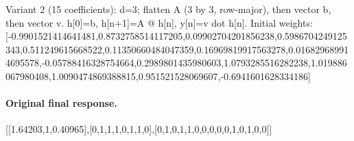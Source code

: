 Variant 2 (15 coefficients): d=3;\allowbreak{} flatten A (3 by 3,\allowbreak{} row-major),\allowbreak{} then vector b,\allowbreak{} then vector v. h[\allowbreak{}0]\allowbreak{}=b,\allowbreak{} h[\allowbreak{}n+1]\allowbreak{}=A @ h[\allowbreak{}n]\allowbreak{},\allowbreak{} y[\allowbreak{}n]\allowbreak{}=v dot h[\allowbreak{}n]\allowbreak{}. Initial weights: [\allowbreak{}-0.9901521414641481,\allowbreak{}0.8732758514117205,\allowbreak{}0.09902704201856238,\allowbreak{}0.5986704249125343,\allowbreak{}0.511249615668522,\allowbreak{}0.11350660484047359,\allowbreak{}0.16969819917563278,\allowbreak{}0.016829689914695578,\allowbreak{}-0.05788416328754664,\allowbreak{}0.2989801435980603,\allowbreak{}1.0793285516282238,\allowbreak{}1.019886067980408,\allowbreak{}1.0090474869388815,\allowbreak{}0.951521528069607,\allowbreak{}-0.6941601628334186]\allowbreak{}\par

\par\endgroup
\paragraph{Original final response.}
\begingroup\footnotesize\ttfamily\raggedright\setlength{\parindent}{0pt}
[\allowbreak{}[\allowbreak{}1.64203,\allowbreak{}1,\allowbreak{}0.40965]\allowbreak{},\allowbreak{}[\allowbreak{}0,\allowbreak{}1,\allowbreak{}1,\allowbreak{}1,\allowbreak{}0,\allowbreak{}1,\allowbreak{}1,\allowbreak{}0]\allowbreak{},\allowbreak{}[\allowbreak{}0,\allowbreak{}1,\allowbreak{}0,\allowbreak{}1,\allowbreak{}1,\allowbreak{}0,\allowbreak{}0,\allowbreak{}0,\allowbreak{}0,\allowbreak{}0,\allowbreak{}1,\allowbreak{}0,\allowbreak{}1,\allowbreak{}0,\allowbreak{}0]\allowbreak{}]\allowbreak{}
\par\endgroup
